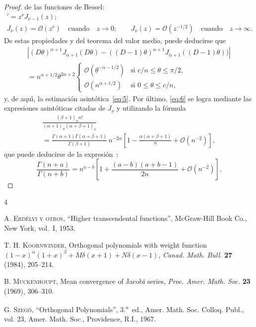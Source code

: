 \documentclass[a4paper]{article}
\newcommand{\calO}{\mathcal{O}}
\begin{document}
\begin{proof}
de las funciones de Bessel:
\begin{gather*}
[z^{\nu}J_{\nu}(z)]' = z^{\nu}J_{\nu-1}(z); \\
J_{\nu}(z) = \calO(z^{\nu}) \quad\text{cuando}\quad z \to 0;
\qquad
J_{\nu}(z) = \calO(z^{-1/2}) \quad\text{cuando}\quad z \to \infty.
\end{gather*}
De estas propiedades y del teorema del valor medio, puede deducirse 
que
\begin{multline*}
\left| (D\theta)^{\alpha+1} J_{\alpha+1}(D\theta) - ((D-1)\theta)^{\alpha+1}
J_{\alpha+1}((D-1)\theta)) \right| \\
= n^{\alpha+1/2} \theta^{2\alpha+2}
\begin{cases}
\calO(\theta^{-\alpha-1/2}) & \text{si } c/n \leq \theta \leq \pi/2, \\
\calO(n^{\alpha+1/2}) & \text{si } 0 \leq \theta \leq c/n,
\end{cases}
\end{multline*}
y, de aqu\'{\i}, la estimaci\'{o}n asint\'{o}tica~\eqref{eq:5}. Por \'{u}ltimo, 
\eqref{eq:6} se logra mediante las expresiones asint\'{o}ticas citadas de 
$J_{\nu}$ y utilizando la f\'{o}rmula
\begin{multline*}
\frac{(\beta+1)_{n} n!}{(\alpha+1)_{n}(\alpha+\beta+1)_{n}} \\
= \frac{\Gamma(\alpha+1)\Gamma(\alpha+\beta+1)}{\Gamma(\beta+1)} 
\, n^{-2\alpha} \left[1 - \frac{\alpha(\alpha+\beta+1)}{n} 
+ \calO(n^{-2}) \right],
\end{multline*}
que puede deducirse de la expresi\'{o}n~\cite{Er}:
$$
\frac{\Gamma(n+a)}{\Gamma(n+b)} 
= n^{a-b} \left[1 + \frac{(a-b)(a+b-1)}{2n} + \calO(n^{-2}) \right].
$$
\end{proof}


\renewcommand{\refname}{Bibliograf\'{\i}a}

\frenchspacing

\begin{thebibliography}{4}

\frenchspacing

\textsc{A. Erd\'{e}lyi y otros},
``Higher transcendental functions'', 
McGraw-Hill Book Co., New York, vol.~I, 1953.

\textsc{T. H. Koornwinder},
Orthogonal polynomials with weight function 
$(1-x)^{\alpha} (1+x)^{\beta} + M \delta(x+1) + N \delta(x-1)$,
\textit{Canad. Math. Bull.} \textbf{27} (1984), 205--214.

\textsc{B. Muckenhoupt}, Mean convergence of Jacobi series,
\textit{Proc. Amer. Math. Soc.} \textbf{23} (1969), 306--310.

\textsc{G. Szeg\H{o}}, ``Orthogonal Polynomials'', 3.\textsuperscript{a}~ed.,
Amer. Math. Soc. Colloq. Publ., vol. 23, Amer. Math. Soc., 
Providence, R.I., 1967.

\end{thebibliography}
\end{document}
